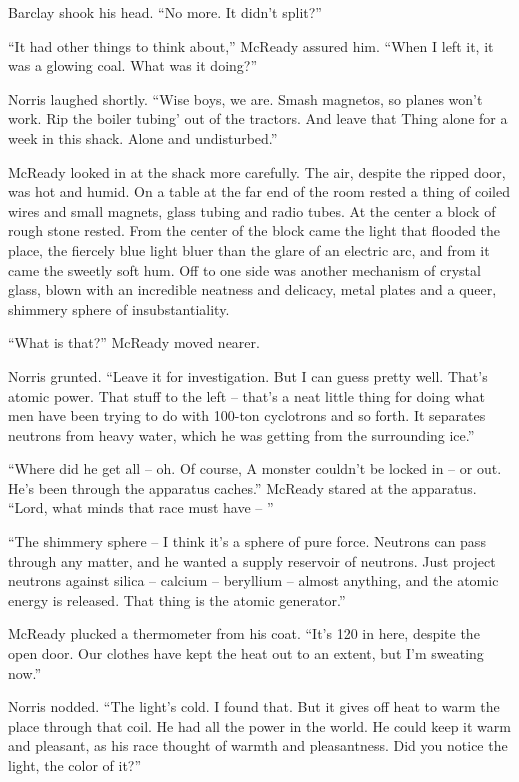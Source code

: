 \documentclass[ebook,oneside,11pt]{memoir}				%
\begin{document}
Barclay shook his head. ``No more. It didn't split?''

``It had other things to think about,'' McReady assured him. ``When I left it, it was a glowing coal. What was it doing?''

Norris laughed shortly. ``Wise boys, we are. Smash magnetos, so planes won't work. Rip the boiler tubing' out of the tractors. And leave that Thing alone for a week in this shack. Alone and undisturbed.''

McReady looked in at the shack more carefully. The air, despite the ripped door, was hot and humid. On a table at the far end of the room rested a thing of coiled wires and small magnets, glass tubing and radio tubes. At the center a block of rough stone rested. From the center of the block came the light that flooded the place, the fiercely blue light bluer than the glare of an electric arc, and from it came the sweetly soft hum. Off to one side was another mechanism of crystal glass, blown with an incredible neatness and delicacy, metal plates and a queer, shimmery sphere of insubstantiality.

``What is that?'' McReady moved nearer.

Norris grunted. ``Leave it for investigation. But I can guess pretty well. That's atomic power. That stuff to the left -- that's a neat little thing for doing what men have been trying to do with 100-ton cyclotrons and so forth. It separates neutrons from heavy water, which he was getting from the surrounding ice.''

``Where did he get all -- oh. Of course, A monster couldn't be locked in -- or out. He's been through the apparatus caches.'' McReady stared at the apparatus. ``Lord, what minds that race must have -- ''

``The shimmery sphere -- I think it's a sphere of pure force. Neutrons can pass through any matter, and he wanted a supply reservoir of neutrons. Just project neutrons against silica -- calcium -- beryllium -- almost anything, and the atomic energy is released. That thing is the atomic generator.''

McReady plucked a thermometer from his coat. ``It's 120 in here, despite the open door. Our clothes have kept the heat out to an extent, but I'm sweating now.''

Norris nodded. ``The light's cold. I found that. But it gives off heat to warm the place through that coil. He had all the power in the world. He could keep it warm and pleasant, as his race thought of warmth and pleasantness. Did you notice the light, the color of it?''
\end{document}
